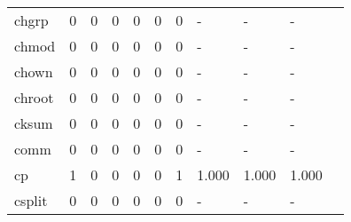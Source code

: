 \begin{longtable}{lp{1.10cm}p{1.10cm}p{1.10cm}p{1.10cm}p{1.10cm}p{1.10cm}p{1.10cm}p{1.10cm}p{1.10cm}p{1.10cm}}
chgrp     &                      0 &                                  0 &                                 0 &                                0 &                                 0 &                               0 &                              - &                                     - &                                   - \\
chmod     &                      0 &                                  0 &                                 0 &                                0 &                                 0 &                               0 &                              - &                                     - &                                   - \\
chown     &                      0 &                                  0 &                                 0 &                                0 &                                 0 &                               0 &                              - &                                     - &                                   - \\
chroot    &                      0 &                                  0 &                                 0 &                                0 &                                 0 &                               0 &                              - &                                     - &                                   - \\
cksum     &                      0 &                                  0 &                                 0 &                                0 &                                 0 &                               0 &                              - &                                     - &                                   - \\
comm      &                      0 &                                  0 &                                 0 &                                0 &                                 0 &                               0 &                              - &                                     - &                                   - \\
cp        &                      1 &                                  0 &                                 0 &                                0 &                                 0 &                               1 &                          1.000 &                                 1.000 &                               1.000 \\
csplit    &                      0 &                                  0 &                                 0 &                                0 &                                 0 &                               0 &                              - &                                     - &                                   - \\

\end{longtable}
